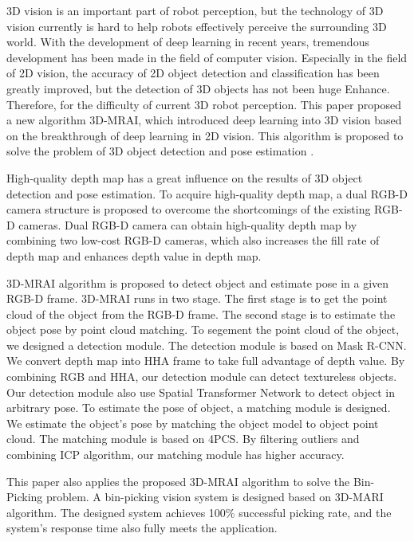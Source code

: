 \begin{eabstract}
3D vision is an important part of robot perception, but the technology of 3D vision currently is hard to help robots effectively perceive the surrounding 3D world. With the development of deep learning in recent years, tremendous development has been made in the field of computer vision. Especially in the field of 2D vision, the accuracy of 2D object detection and classification has been greatly improved, but the detection of 3D objects has not been huge Enhance. Therefore, for the difficulty of current 3D robot perception. This paper proposed a new algorithm 3D-MRAI, which introduced deep learning into 3D vision based on the breakthrough of deep learning in 2D vision. This algorithm is proposed to solve the problem of 3D object detection and pose estimation .

High-quality depth map has a great influence on the results of 3D object detection and pose estimation. To acquire high-quality depth map, a dual RGB-D camera structure is proposed to overcome the shortcomings of the existing RGB-D cameras. Dual RGB-D camera can obtain high-quality depth map by combining two low-cost RGB-D cameras, which also increases the fill rate of depth map and enhances depth value in depth map.

3D-MRAI algorithm is proposed to detect object and estimate pose in a given RGB-D frame. 3D-MRAI runs in two stage. The first stage is to get the point cloud of the object from the RGB-D frame. The second stage is to estimate the object pose by point cloud matching. To segement the point cloud of the object, we designed a detection module. The detection module is based on Mask R-CNN. We convert depth map into HHA frame to take full advantage of depth value. By combining RGB and HHA, our detection module can detect textureless objects. Our detection module also  use Spatial Transformer Network to detect object in arbitrary pose.  To estimate the pose of object, a matching module is designed. We estimate the object's pose by matching the object model to object point cloud. The matching module is based on 4PCS. By filtering outliers and combining ICP algorithm, our matching module has higher accuracy.

  This paper also applies the proposed 3D-MRAI algorithm to solve the Bin-Picking problem. A bin-picking vision system is designed based on 3D-MARI algorithm. The designed system achieves 100\% successful picking rate, and the system's response time also fully meets the application.

\end{eabstract}


